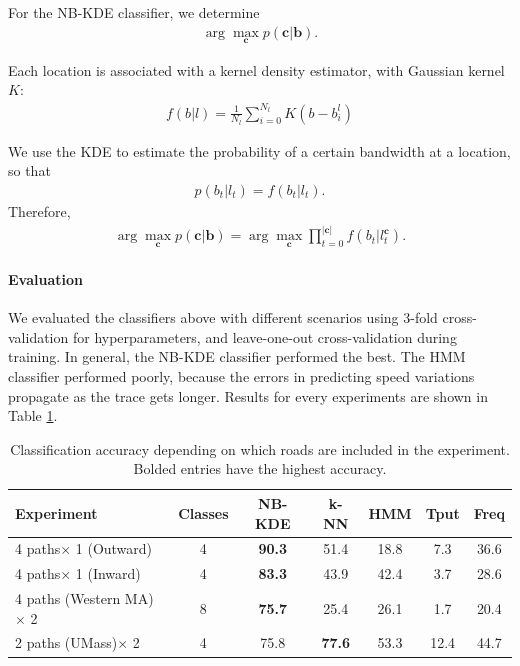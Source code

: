 For the NB-KDE classifier, we determine
\begin{align}
\arg\max_{\mathbf{c}}p(\mathbf{c}|\mathbf{b}).
\end{align}

\noindent
Each location is associated with a kernel density estimator, with
Gaussian kernel $K$:
\begin{align}
f(b|l)=\frac{1}{N_{l}}\sum_{i=0}^{N_{l}}K(b-b_{i}^{l})
\end{align}

\noindent
We use the KDE to estimate the probability of a certain bandwidth
at a location, so that
\begin{align}
p(b_{t}|l_{t})=f(b_{t}|l_{t}).
\end{align}
Therefore,
\begin{align}
\arg\max_{\mathbf{c}}p(\mathbf{c}|\mathbf{b})=\arg\max_{\mathbf{c}}\prod_{t=0}^{|\mathbf{c|}}f(b_{t}|l_{t}^{\mathbf{c}}).
\end{align}

\paragraph*{Evaluation}
We evaluated the classifiers above with different scenarios using 3-fold cross-validation for hyperparameters, and leave-one-out cross-validation during training. In general, the NB-KDE classifier performed the best. The HMM classifier performed poorly, because the errors in predicting speed variations propagate as the trace gets longer. Results for every experiments are shown in Table \ref{table:mobile-accuracy}.

\begin{table}
	\centering
	\begin{tabular}{lcccccc}
			\hline {\textbf{Experiment}}&
			{\textbf{Classes}}&
			{\textbf{NB-KDE}}&
			{\textbf{k-NN}}&
			{\textbf{HMM}}&
			{\textbf{Tput}}&
			{\textbf{Freq}}\\
			\hline \hline
			4 paths$\times$ 1  (Outward)   & 4 & {\bf 90.3} & 51.4 & 18.8 &7.3 &36.6\\
			4 paths$\times$ 1  (Inward)    & 4 & {\bf 83.3} & 43.9 & 42.4 & 3.7 &28.6\\\hline
			4 paths (Western MA)$\times$ 2 & 8 & {\bf 75.7} & 25.4 & 26.1 &1.7&20.4\\\hline
			2 paths (UMass)$\times$ 2      & 4 & 75.8 & {\bf 77.6} & 53.3 &12.4& 44.7\\
			\hline
	\end{tabular}
	\caption{Classification accuracy depending on which roads are included in the experiment. Bolded entries have the highest accuracy.}
	\label{table:mobile-accuracy}
\end{table}

